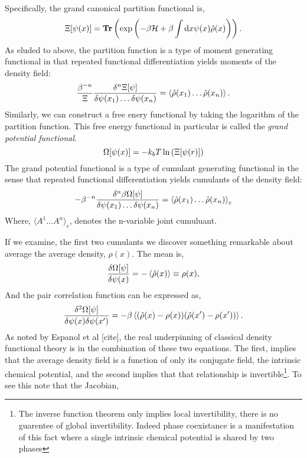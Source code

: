 Specifically, the grand canonical partition functional is,
\begin{equation}
    \Xi[\psi(x)] = \mathbf{Tr}\left( \exp\left(-\beta\mathcal{H} +\beta\int\mathrm{d}x \psi(x) \hat{\rho}(x)\right) \right).
\end{equation}
As eluded to above, the partition function is a type of moment generating functional in that repeated functional differentiation yields moments of the density field:
\begin{equation}
   \frac{\beta^{-n}}{\Xi} \frac{\delta^n \Xi[\psi]}{\delta \psi(x_1) \dots \delta\psi(x_n)} = \left\langle \hat{\rho}(x_1)\dots\hat{\rho}(x_n) \right\rangle.
\end{equation}
Similarly, we can construct a free enery functional by taking the logarithm of the partition function. This free energy functional in particular is called the \textit{grand potential functional}.
\begin{equation}
    \Omega[\psi(x)] = -k_bT\ln\left(\Xi[\psi(r)]\right)
\end{equation}
The grand potential functional is a type of cumulant generating functional in the sense that repeated functional differentiation yields cumulants of the density field:
\begin{equation}
    -\beta^{-n}\frac{\delta^n \beta\Omega[\psi]}{\delta\psi(x_1)\dots\delta\psi(x_n)} = \left\langle \hat{\rho}(x_1)\dots\hat{\rho}(x_n) \right\rangle_c
\end{equation}
Where, $\langle A^1\dots A^n \rangle_c$, denotes the n-variable joint cumuluant.

If we examine, the first two cumulants we discover something remarkable about average the average density, $\rho(x)$. The mean is,
\begin{equation}
    \frac{\delta \Omega[\psi]}{\delta \psi(x)} = -\left\langle \hat{\rho}(x) \right\rangle \equiv \rho(x),
\end{equation}
And the pair correlation function can be expressed as, 
\begin{equation}
    \frac{\delta^2 \Omega[\psi]}{\delta \psi(x) \delta \psi(x^\prime)} = - \beta \left\langle (\hat{\rho}(x) - \rho(x))(\hat{\rho}(x^\prime) - \rho(x^\prime)) \right\rangle.
\end{equation}
As noted by Espanol et al [cite], the real underpinning of classical density functional theory is in the combination of these two equations.
The first, implies that the average density field is a function of only its conjugate field, the intrinsic chemical potential, and the second implies that that relationship is invertible\footnote{The inverse function theorem only implies local invertibility, there is no guarentee of global invertibility. Indeed phase coexistance is a manifestation of this fact where a single intrinsic chemical potential is shared by two phases}.
To see this note that the Jacobian, 

